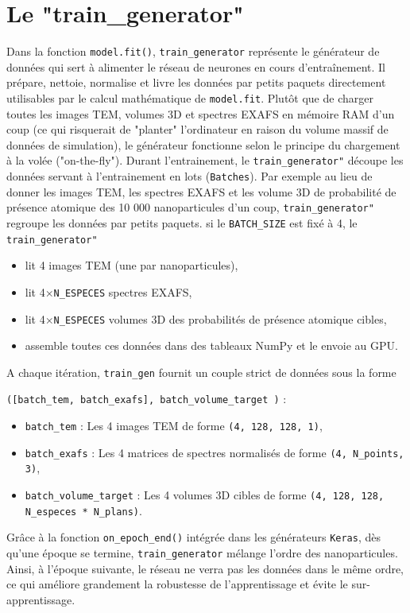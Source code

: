 \documentclass[12pt,a4paper,french]{book}
\begin{document}
\cprotect\section{Le "train\_generator"}

Dans la fonction \verb+model.fit()+, \verb+train_generator+ représente le générateur de données qui sert  à alimenter le réseau de neurones en cours d'entraînement. 
Il prépare, nettoie, normalise et livre les données par petits paquets directement utilisables par le calcul mathématique de \verb+model.fit+.
Plutôt que de charger toutes les images TEM, volumes 3D et spectres EXAFS en mémoire RAM d'un coup (ce qui risquerait de "planter" l'ordinateur en raison du volume massif de données de simulation), le générateur fonctionne selon le principe du chargement à la volée ("on-the-fly").
Durant l'entrainement, le \verb+train_generator"+ découpe les données servant à l'entrainement en lots (\verb+Batches+). Par exemple au lieu de donner les images TEM, les spectres EXAFS et les volume 3D de probabilité de présence atomique des 10 000 nanoparticules d'un coup, \verb+train_generator"+ regroupe les données par petits paquets. si le \verb+BATCH_SIZE+ est fixé à 4, le \verb+train_generator"+
	\begin{itemize}
		\item lit 4 images TEM (une par nanoparticules),
		\item lit 4$\times$\verb+N_ESPECES+ spectres EXAFS,
		\item lit 4$\times$\verb+N_ESPECES+ volumes 3D des probabilités de présence atomique cibles,
		\item assemble toutes ces données dans des tableaux NumPy et le envoie au GPU.
	\end{itemize}
A chaque itération, \verb+train_gen+ fournit un couple strict de données sous la forme

 \verb+([batch_tem, batch_exafs], batch_volume_target )+ :
 \begin{itemize}
 	\item \verb+batch_tem+ : Les 4 images TEM de forme \verb+(4, 128, 128, 1)+,
 	\item \verb+batch_exafs+ : Les 4 matrices de spectres normalisés de forme \verb+(4, N_points, 3)+,
 	\item \verb+batch_volume_target+ : Les 4 volumes 3D cibles de forme \verb+(4, 128, 128, N_especes * N_plans)+.
 \end{itemize}

Grâce à la fonction \verb+on_epoch_end()+ intégrée dans les générateurs \verb+Keras+, dès qu'une époque se termine, \verb+train_generator+ mélange l'ordre des nanoparticules. Ainsi, à l'époque suivante, le réseau ne verra pas les données dans le même ordre, ce qui améliore grandement la robustesse de l'apprentissage et évite le sur-apprentissage.
\end{document}
